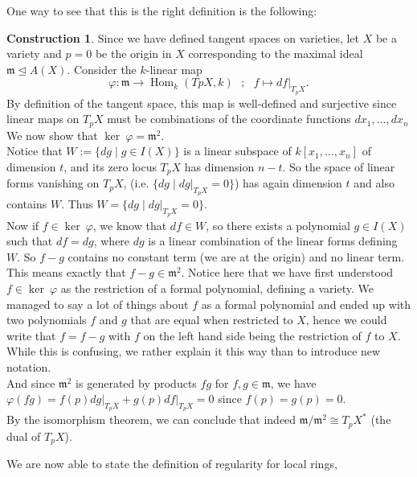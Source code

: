 \documentclass{article}
\theoremstyle{plain}
\theoremstyle{definition}
\newtheorem{construction}[theorem]{Construction}
\DeclareMathOperator{\Hom}{Hom}
\begin{document}
\noindent One way to see that this is the right definition is the following:

\begin{construction}
    Since we have defined tangent spaces on varieties, 
    let $X$ be a variety and $p=0$ be the origin in $X$ corresponding to the maximal ideal $\mathfrak{m} \trianglelefteq A(X)$.
    Consider the $k$-linear map 
    $$\varphi : \mathfrak{m} \rightarrow \Hom_k(TpX,k) \textbf{   } ;\textbf{ }f\mapsto df\vert_{T_pX}.$$
    By definition of the tangent space, this map is well-defined and surjective since linear maps on $T_pX$ must be combinations of the coordinate functions $dx_1,...,dx_n$
    We now show that $\ker\:\varphi = \mathfrak{m}^2$.\\
    Notice that $W := \{dg \mid g\in I(X)\}$ is a linear subspace of $k[x_1,...,x_n]$ of dimension $t$, and its zero locus $T_pX$ has dimension $n-t$. 
    So the space of linear forms vanishing on $T_pX$, (i.e. $\{ dg \mid dg\vert_{T_pX} = 0\}$) has again dimension $t$ and also contains $W$. Thus $W = \{ dg \mid dg\vert_{T_pX} = 0\}$.\\
    Now if $f\in \ker\:\varphi$, we know that $df \in W$, so there exists a polynomial $g\in I(X)$ such that $df=dg$, where $dg$ is a linear combination of the linear forms defining $W$. So $f-g$ contains no constant term (we are at the origin) and no linear term. This means exactly that $f-g\in\mathfrak{m}^2$. 
    Notice here that we have first understood $f\in \ker\:\varphi$ as the restriction of a formal polynomial, defining a variety.
    We managed to say a lot of things about $f$ as a formal polynomial and ended up with two polynomials $f$ and $g$ that are equal when restricted to $X$, hence we could write that $f = f-g$ with $f$ on the left hand side being the restriction of $f$ to $X$. 
    While this is confusing, we rather explain it this way than to introduce new notation.\\
    And since $\mathfrak{m}^2$ is generated by products $fg$ for $f,g\in\mathfrak{m}$, we have $\varphi(fg) =f(p)dg\vert_{T_pX} + g(p)df\vert_{T_pX} = 0$ since $f(p)=g(p) = 0$.\\
    By the isomorphism theorem, we can conclude that indeed $\mathfrak{m}/\mathfrak{m}^2 \cong T_pX^*$ (the dual of $T_pX$).
\end{construction}





\noindent We are now able to state the definition of regularity for local rings, 
\end{document}

